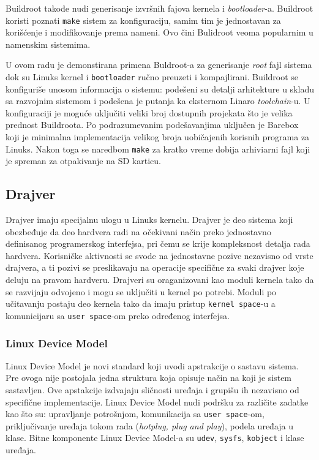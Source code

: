 Buildroot takođe nudi generisanje izvršnih fajova kernela i \textit{bootloader}-a. Buildroot koristi poznati \texttt{make} sistem za konfiguraciju, samim tim je jednostavan za korišćenje i modifikovanje prema nameni. Ovo čini Bulidroot veoma popularnim u namenskim sistemima.

U ovom radu je demonstirana primena Buldroot-a za generisanje \textit{root} fajl sistema dok su Linuks kernel i \texttt{bootloader} ručno preuzeti i kompajlirani. Buildroot se konfiguriše unosom informacija o sistemu: podešeni su detalji arhitekture u skladu sa razvojnim sistemom i podešena je putanja ka eksternom Linaro \textit{toolchain}-u. U konfiguraciji je moguće uključiti veliki broj dostupnih projekata što je velika prednost Buildroota. Po podrazumevanim podešavanjima uključen je Barebox koji je minimalna implementacija velikog broja uobičajenih korisnih programa za Linuks. Nakon toga se naredbom \texttt{make} za kratko vreme dobija arhiviarni fajl koji je spreman za otpakivanje na SD karticu.

\subsection{Drajver}
Drajver imaju specijalnu ulogu u Linuks kernelu. Drajver je deo sistema koji obezbeđuje da deo hardvera radi na očekivani način preko jednostavno definisanog programerskog interfejsa, pri čemu se krije kompleksnost detalja rada hardvera. Korisničke aktivnosti se svode na jednostavne pozive nezavisno od vrste drajvera, a ti pozivi se preslikavaju na operacije specifične za svaki drajver koje deluju na pravom hardveru. Drajveri su oraganizovani kao moduli kernela tako da se razvijaju odvojeno i mogu se uključiti u kernel po potrebi. Moduli po učitavanju postaju deo kernela tako da imaju pristup \texttt{kernel space}-u a komunicijaru sa \texttt{user space}-om preko određenog interfejsa.

\subsubsection{Linux Device Model}
Linux Device Model je novi standard koji uvodi apstrakcije o sastavu sistema. Pre ovoga nije postojala jedna struktura koja opisuje način na koji je sistem sastavljen. Ove apstakcije izdvajaju sličnosti uređaja i grupišu ih nezavisno od specifične implementacije. Linux Device Model nudi podršku za različite zadatke kao što su: upravljanje potrošnjom, komunikacija sa \texttt{user space}-om, priključivanje uređaja tokom rada (\textit{hotplug, plug and play}), podela uređaja u klase. Bitne komponente Linux Device Model-a su \texttt{udev}, \texttt{sysfs}, \texttt{kobject} i klase uređaja.

